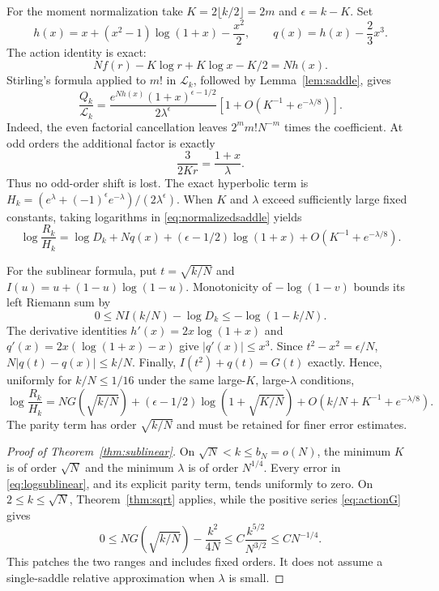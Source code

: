 \documentclass[11pt]{article}
\theoremstyle{definition}
\theoremstyle{remark}
\newcommand{\1}{\mathbf 1}
\begin{document}
For the moment normalization take $K=2\lfloor k/2\rfloor=2m$ and $\epsilon=k-K$. Set
\begin{equation}\label{eq:actionq}
h(x)=x+(x^2-1)\log(1+x)-\frac{x^2}{2},\qquad
q(x)=h(x)-\frac23x^3.
\end{equation}
The action identity is exact:
\[
Nf(r)-K\log r+K\log x-K/2=Nh(x).
\]
Stirling's formula applied to $m!$ in $\mathcal L_k$, followed by Lemma~\ref{lem:saddle}, gives
\begin{equation}\label{eq:normalizedsaddle}
\frac{Q_k}{\mathcal L_k}
=\frac{e^{Nh(x)}(1+x)^{\epsilon-1/2}}{2\lambda^\epsilon}
\left[1+O\left(K^{-1}+e^{-\lambda/8}\right)\right].
\end{equation}
Indeed, the even factorial cancellation leaves $2^mm!N^{-m}$ times the coefficient. At odd orders the additional factor is exactly
\[
\frac3{2Kr}=\frac{1+x}{\lambda}.
\]
Thus no odd-order shift is lost. The exact hyperbolic term is
$H_k=(e^\lambda+(-1)^\epsilon e^{-\lambda})/(2\lambda^\epsilon)$.
When $K$ and $\lambda$ exceed sufficiently large fixed constants, taking logarithms in \eqref{eq:normalizedsaddle} yields
\begin{equation}\label{eq:logsaddle}
\log\frac{R_k}{H_k}
=\log D_k+Nq(x)+(\epsilon-1/2)\log(1+x)
+O\left(K^{-1}+e^{-\lambda/8}\right).
\end{equation}

For the sublinear formula, put $t=\sqrt{k/N}$ and
$I(u)=u+(1-u)\log(1-u)$. Monotonicity of $-\log(1-v)$ bounds its left Riemann sum by
\begin{equation}\label{eq:denominatorintegral}
0\le NI(k/N)-\log D_k\le-\log(1-k/N).
\end{equation}
The derivative identities
$h'(x)=2x\log(1+x)$ and $q'(x)=2x(\log(1+x)-x)$ give $|q'(x)|\le x^3$. Since $t^2-x^2=\epsilon/N$,
$N|q(t)-q(x)|\le k/N$. Finally, $I(t^2)+q(t)=G(t)$ exactly. Hence, uniformly for $k/N\le1/16$ under the same large-$K$, large-$\lambda$ conditions,
\begin{equation}\label{eq:logsublinear}
\log\frac{R_k}{H_k}
=NG(\sqrt{k/N})+(\epsilon-1/2)\log(1+\sqrt{K/N})
+O\left(k/N+K^{-1}+e^{-\lambda/8}\right).
\end{equation}
The parity term has order $\sqrt{k/N}$ and must be retained for finer error estimates.

\begin{proof}[Proof of Theorem~\ref{thm:sublinear}]
On $\sqrt N<k\le b_N=o(N)$, the minimum $K$ is of order $\sqrt N$ and the minimum $\lambda$ is of order $N^{1/4}$. Every error in \eqref{eq:logsublinear}, and its explicit parity term, tends uniformly to zero. On $2\le k\le\sqrt N$, Theorem~\ref{thm:sqrt} applies, while the positive series \eqref{eq:actionG} gives
\[
0\le NG(\sqrt{k/N})-\frac{k^2}{4N}
\le C\frac{k^{5/2}}{N^{3/2}}\le CN^{-1/4}.
\]
This patches the two ranges and includes fixed orders. It does not assume a single-saddle relative approximation when $\lambda$ is small.
\end{proof}
\end{document}
